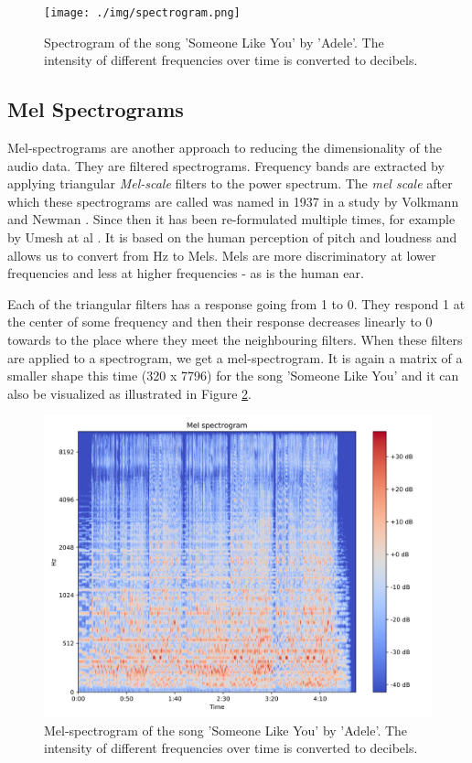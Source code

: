 \begin{figure}[h!]
    \centering
	\texttt{[image: ./img/spectrogram.png]}
	\caption{Spectrogram of the song 'Someone Like You' by 'Adele'. The intensity of different frequencies over time is converted to decibels.}
	\label{fig:ilustrative_specrogram}
\end{figure}


\subsection{Mel Spectrograms}\label{ssec:mel_spectrograms_intro}
Mel-spectrograms are another approach to reducing the dimensionality of the audio data. They are filtered spectrograms. Frequency bands are extracted by applying triangular \textit{Mel-scale} filters to the power spectrum. The \textit{mel scale} after which these spectrograms are called was named in 1937 in a study by Volkmann and Newman \cite{1937ASAJ....8..185S}. Since then it has been re-formulated multiple times, for example by Umesh at al \cite{mel_scale_fit}. It is based on the human perception of pitch and loudness and allows us to convert from Hz to Mels. Mels are more discriminatory at lower frequencies and less at higher frequencies - as is the human ear. 

Each of the triangular filters has a response going from 1 to 0. They respond 1 at the center of some frequency and then their response decreases linearly to 0 towards to the place where they meet the neighbouring filters. When these filters are applied to a spectrogram, we get a mel-spectrogram. It is again a matrix of a smaller shape this time (320 x 7796) for the song 'Someone Like You' and it can also be visualized as illustrated in Figure \ref{fig:ilustrative_melspecrogram}.

\begin{figure}[h!]
    \centering
	\includegraphics[width=140mm]{./img/melspectrogram.png}
	\caption{Mel-spectrogram of the song 'Someone Like You' by 'Adele'. The intensity of different frequencies over time is converted to decibels.}
	\label{fig:ilustrative_melspecrogram}
\end{figure}


